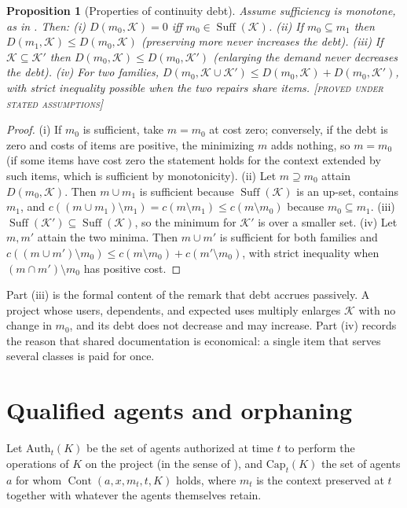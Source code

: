 \documentclass[11pt,twoside,openright]{book}
\theoremstyle{plain}
\newtheorem{proposition}[theorem]{Proposition}
\theoremstyle{definition}
\theoremstyle{remark}
\newcommand{\Proved}{\textup{\textsc{[proved under stated assumptions]}}}
\newcommand{\Cont}{\operatorname{Cont}}
\newcommand{\Suff}{\operatorname{Suff}}
\begin{document}
\begin{proposition}[Properties of continuity debt]\label{prop:debtprops}
Assume sufficiency is monotone, as in . Then:
(i) $D(m_0,\mathcal{K})=0$ iff $m_0\in\Suff(\mathcal{K})$.
(ii) If $m_0\subseteq m_1$ then $D(m_1,\mathcal{K})\le D(m_0,\mathcal{K})$ (preserving more never increases the debt).
(iii) If $\mathcal{K}\subseteq\mathcal{K}'$ then $D(m_0,\mathcal{K})\le D(m_0,\mathcal{K}')$ (enlarging the demand never decreases the debt).
(iv) For two families, $D(m_0,\mathcal{K}\cup\mathcal{K}')\le D(m_0,\mathcal{K})+D(m_0,\mathcal{K}')$, with strict inequality possible when the two repairs share items.
\Proved{}
\end{proposition}

\begin{proof}
(i) If $m_0$ is sufficient, take $m=m_0$ at cost zero; conversely, if the debt is zero and costs of items are positive, the minimizing $m$ adds nothing, so $m=m_0$ (if some items have cost zero the statement holds for the context extended by such items, which is sufficient by monotonicity). (ii) Let $m\supseteq m_0$ attain $D(m_0,\mathcal{K})$. Then $m\cup m_1$ is sufficient because $\Suff(\mathcal{K})$ is an up-set, contains $m_1$, and $c((m\cup m_1)\setminus m_1)=c(m\setminus m_1)\le c(m\setminus m_0)$ because $m_0\subseteq m_1$. (iii) $\Suff(\mathcal{K}')\subseteq\Suff(\mathcal{K})$, so the minimum for $\mathcal{K}'$ is over a smaller set. (iv) Let $m,m'$ attain the two minima. Then $m\cup m'$ is sufficient for both families and $c((m\cup m')\setminus m_0)\le c(m\setminus m_0)+c(m'\setminus m_0)$, with strict inequality when $(m\cap m')\setminus m_0$ has positive cost.
\end{proof}

Part (iii) is the formal content of the remark that debt accrues passively. A project whose users, dependents, and expected uses multiply enlarges $\mathcal{K}$ with no change in $m_0$, and its debt does not decrease and may increase. Part (iv) records the reason that shared documentation is economical: a single item that serves several classes is paid for once.

\section{Qualified agents and orphaning}

Let $\mathrm{Auth}_t(K)$ be the set of agents authorized at time $t$ to perform the operations of $K$ on the project (in the sense of ), and $\mathrm{Cap}_t(K)$ the set of agents $a$ for whom $\Cont(a,x,m_t,t,K)$ holds, where $m_t$ is the context preserved at $t$ together with whatever the agents themselves retain.
\end{document}
